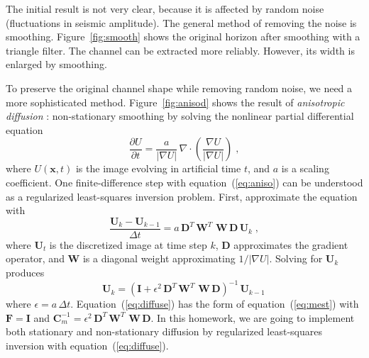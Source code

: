 
The initial result is not very clear, because it is affected by random
noise (fluctuations in seismic amplitude). The general method of
removing the noise is smoothing. Figure~\ref{fig:smooth} shows the
original horizon after smoothing with a triangle filter. The channel
can be extracted more reliably. However, its width is enlarged by smoothing.


To preserve the original channel shape while removing random noise, we
need a more sophisticated method. Figure~\ref{fig:anisod} shows
the result of \emph{anisotropic diffusion} \cite[]{weickert}:
non-stationary smoothing by solving the nonlinear partial differential equation
\begin{equation}
\label{eq:aniso}
\frac{\partial U}{\partial t} = \frac{a}{|\nabla U|}\,\nabla \cdot \left(\frac{\nabla U}{|\nabla U|}\right)\;,
\end{equation}
where $U(\mathbf{x},t)$ is the image evolving in artificial time $t$,
and $a$ is a scaling coefficient. One finite-difference step with
equation~(\ref{eq:aniso}) can be understood as a regularized
least-squares inversion problem. First, approximate the equation with
\begin{equation}
\label{eq:aniso}
\frac{\mathbf{U}_k-\mathbf{U}_{k-1}}{\Delta t} = a\,\mathbf{D}^T\,\mathbf{W}^T\,\,\mathbf{W}\,\mathbf{D}\,\mathbf{U}_k\;,
\end{equation}
where $\mathbf{U}_t$ is the discretized image at time step $k$,
$\mathbf{D}$ approximates the gradient operator, and $\mathbf{W}$ is a
diagonal weight approximating $1/|\nabla U|$. Solving for $\mathbf{U}_k$ produces
\begin{equation}
\label{eq:diffuse}
\mathbf{U}_k = \left(\mathbf{I} + \epsilon^2\,\mathbf{D}^T\,\mathbf{W}^T\,\,\mathbf{W}\,\mathbf{D}\right)^{-1}\,\mathbf{U}_{k-1}\,
\end{equation}
where $\epsilon=a\,\Delta t$. Equation~(\ref{eq:diffuse}) has the form
of equation~(\ref{eq:mest}) with $\mathbf{F}=\mathbf{I}$ and
$\mathbf{C}_m^{-1} =
\epsilon^2\,\mathbf{D}^T\,\mathbf{W}^T\,\,\mathbf{W}\,\mathbf{D}$. In this homework, we are going to implement both stationary and
non-stationary diffusion by regularized least-squares inversion with
equation~(\ref{eq:diffuse}).

